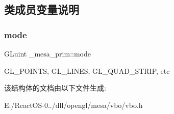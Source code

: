 \subsection{类成员变量说明}
\mbox{\label{struct__mesa__prim_aabdd6cc399a4b144bc626b4633e326e0}} 
\subsubsection{\texorpdfstring{mode}{mode}}
{\footnotesize\ttfamily G\+Luint \+\_\+mesa\+\_\+prim\+::mode}

G\+L\+\_\+\+P\+O\+I\+N\+TS, G\+L\+\_\+\+L\+I\+N\+ES, G\+L\+\_\+\+Q\+U\+A\+D\+\_\+\+S\+T\+R\+IP, etc 

该结构体的文档由以下文件生成\+:\begin{DoxyCompactItemize}
\item 
E\+:/\+React\+O\+S-\/0../dll/opengl/mesa/vbo/vbo.\+h\end{DoxyCompactItemize}
